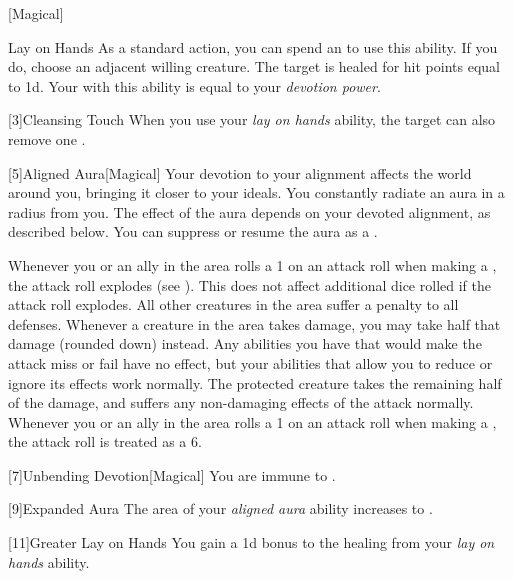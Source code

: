         [Magical]
        \begin{ability}{Lay on Hands}
            As a standard action, you can spend an  to use this ability.
            If you do, choose an adjacent willing creature.
            The target is healed for hit points equal to  \plus1d.
            Your  with this ability is equal to your \textit{devotion power}.
        \end{ability}

        [3]{Cleansing Touch} When you use your \textit{lay on hands} ability, the target can also remove one .

        [5]{Aligned Aura}[Magical]
        Your devotion to your alignment affects the world around you, bringing it closer to your ideals.
        You constantly radiate an aura in a \areamed radius  from you.
        The effect of the aura depends on your devoted alignment, as described below.
        You can suppress or resume the aura as a .

         Whenever you or an ally in the area rolls a 1 on an attack roll when making a , the attack roll explodes (see ).
        This does not affect additional dice rolled if the attack roll explodes.
         All other creatures in the area suffer a  penalty to all defenses.
         Whenever a creature in the area takes damage, you may take half that damage (rounded down) instead.
        Any abilities you have that would make the attack miss or fail have no effect, but your abilities that allow you to reduce or ignore its effects work normally.
        The protected creature takes the remaining half of the damage, and suffers any non-damaging effects of the attack normally.
         Whenever you or an ally in the area rolls a 1 on an attack roll when making a , the attack roll is treated as a 6.

        [7]{Unbending Devotion}[Magical]
        You are immune to  .

        [9]{Expanded Aura}
        The area of your \textit{aligned aura} ability increases to \arealarge.

        [11]{Greater Lay on Hands} 
        You gain a \plus1d bonus to the healing from your \textit{lay on hands} ability.

